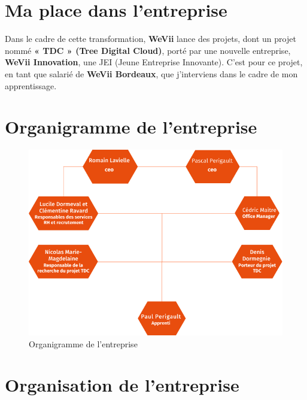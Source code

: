 \section{Ma place dans l'entreprise}

Dans le cadre de cette transformation, \textbf{WeVii} lance des projets, dont un projet nommé \textbf{« TDC » (Tree Digital Cloud)}, porté par une nouvelle entreprise, \textbf{WeVii Innovation}, une JEI (Jeune Entreprise Innovante).
C’est pour ce projet, en tant que salarié de \textbf{WeVii Bordeaux}, que j’interviens dans le cadre de mon apprentissage.

\section{Organigramme de l'entreprise}
\begin{figure}[H]
    \centering
    \includegraphics[width=\textwidth]{image/organigrammeEntreprise}
    \caption[Organigramme de l'entreprise]{Organigramme de l'entreprise}
    \label{fig:organigramme_entreprise}
\end{figure}

\section{Organisation de l'entreprise}

